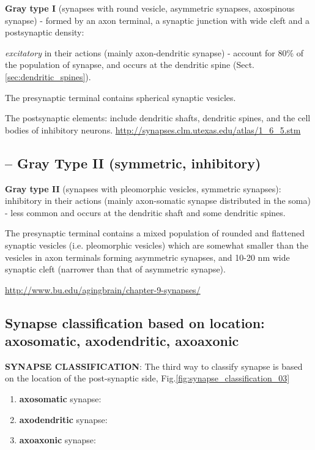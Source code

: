 {\bf Gray type I} (synapses with round vesicle, asymmetric synapses,
  axospinous synapse) - formed by an axon terminal, a synaptic junction with
  wide cleft and a postsynaptic density:
  
  {\it excitatory} in their actions (mainly axon-dendritic synapse) - account
  for 80\% of the population of synapse, and occurs  at the dendritic spine
  (Sect.\ref{sec:dendritic_spines}).

The presynaptic terminal contains spherical synaptic vesicles.

The postsynaptic elements: include dendritic shafts, dendritic spines, and the
cell bodies of inhibitory neurons. 
\url{http://synapses.clm.utexas.edu/atlas/1_6_5.stm}


\subsection{-- Gray Type II (symmetric, inhibitory)}
  
{\bf Gray type II} (synapses with pleomorphic vesicles, symmetric synapses):
inhibitory in their actions (mainly axon-somatic synapse distributed in the
soma) - less common and occurs at the dendritic shaft and some dendritic spines.
  
The presynaptic terminal contains a mixed population of rounded and flattened
synaptic vesicles (i.e. pleomorphic vesicles) which are somewhat smaller than
the vesicles in axon terminals forming asymmetric synapses, and 10-20 nm wide
synaptic cleft (narrower than that of asymmetric synapse).

\url{http://www.bu.edu/agingbrain/chapter-9-synapses/}




\subsection{Synapse classification based on location: axosomatic, axodendritic,
axoaxonic}

{\bf SYNAPSE CLASSIFICATION}: The third way to classify synapse is
based on the location of the post-synaptic side, Fig.\ref{fig:synapse_classification_03}
\begin{enumerate}
  \item {\bf axosomatic} synapse: 
  
  \item {\bf axodendritic} synapse:
  
  \item {\bf axoaxonic} synapse:
\end{enumerate}

